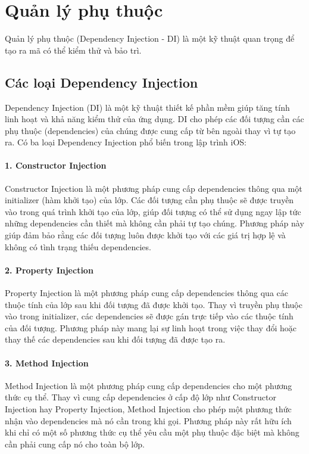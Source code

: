 \section{Quản lý phụ thuộc}
\hspace*{0.8cm}Quản lý phụ thuộc (Dependency Injection - DI) là một kỹ thuật quan trọng để tạo ra mã có thể kiểm thử và bảo trì.

\subsection{Các loại Dependency Injection}

Dependency Injection (DI) là một kỹ thuật thiết kế phần mềm giúp tăng tính linh hoạt và khả năng kiểm thử của ứng dụng. DI cho phép các đối tượng cần các phụ thuộc (dependencies) của chúng được cung cấp từ bên ngoài thay vì tự tạo ra. Có ba loại Dependency Injection phổ biến trong lập trình iOS:

\paragraph*{1. Constructor Injection}
Constructor Injection là một phương pháp cung cấp dependencies thông qua một initializer (hàm khởi tạo) của lớp. Các đối tượng cần phụ thuộc sẽ được truyền vào trong quá trình khởi tạo của lớp, giúp đối tượng có thể sử dụng ngay lập tức những dependencies cần thiết mà không cần phải tự tạo chúng. Phương pháp này giúp đảm bảo rằng các đối tượng luôn được khởi tạo với các giá trị hợp lệ và không có tình trạng thiếu dependencies.

\paragraph*{2. Property Injection}
Property Injection là một phương pháp cung cấp dependencies thông qua các thuộc tính của lớp sau khi đối tượng đã được khởi tạo. Thay vì truyền phụ thuộc vào trong initializer, các dependencies sẽ được gán trực tiếp vào các thuộc tính của đối tượng. Phương pháp này mang lại sự linh hoạt trong việc thay đổi hoặc thay thế các dependencies sau khi đối tượng đã được tạo ra.

\paragraph*{3. Method Injection}
  Method Injection là một phương pháp cung cấp dependencies cho một phương thức cụ thể. Thay vì cung cấp dependencies ở cấp độ lớp như Constructor Injection hay Property Injection, Method Injection cho phép một phương thức nhận vào dependencies mà nó cần trong khi gọi. Phương pháp này rất hữu ích khi chỉ có một số phương thức cụ thể yêu cầu một phụ thuộc đặc biệt mà không cần phải cung cấp nó cho toàn bộ lớp.

